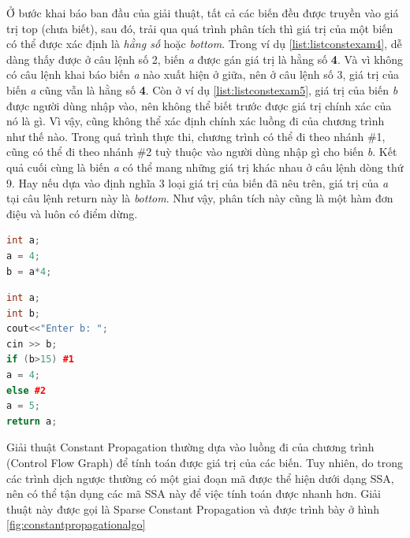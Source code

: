 Ở bước khai báo ban đầu của giải thuật, tất cả các biến đều được truyền vào giá trị top (chưa biết), sau đó, trải qua quá trình phân tích thì giá trị của một biến có thể được xác định là \textit{hằng số} hoặc \textit{bottom}. Trong ví dụ \ref{list:listconstexam4}, dễ dàng thấy được ở câu lệnh số 2, biến \textit{a} được gán giá trị là hằng số \textbf{4}. Và vì không có câu lệnh khai báo biến \textit{a} nào xuất hiện ở giữa, nên ở câu lệnh số 3, giá trị của biến \textit{a} cũng vẫn là hằng số \textbf{4}. Còn ở ví dụ \ref{list:listconstexam5}, giá trị của biến \textit{b} được người dùng nhập vào, nên không thể biết trước được giá trị chính xác của nó là gì. Vì vậy, cũng không thể xác định chính xác luồng đi của chương trình như thế nào. Trong quá trình thực thi, chương trình có thể đi theo nhánh \#1, cũng có thể đi theo nhánh \#2 tuỳ thuộc vào người dùng nhập gì cho biến \textit{b}. Kết quả cuối cùng là biến \textit{a} có thể mang những giá trị khác nhau ở câu lệnh dòng thứ 9. Hay nếu dựa vào định nghĩa 3 loại giá trị của biến đã nêu trên, giá trị của \textit{a} tại câu lệnh return này là \textit{bottom}. Như vậy, phân tích này cũng là một hàm đơn điệu \cite{constantpropagation} và luôn có điểm dừng.
\begin{lstlisting}[caption={Đoạn mã ví dụ biến có giá trị là hằng số},label={list:listconstexam4}, language=c++]
int a;
a = 4;
b = a*4;
\end{lstlisting}
\begin{lstlisting}[caption={Đoạn mã ví dụ biến có giá trị là bottom},label={list:listconstexam5}, language=c++]
int a;
int b;
cout<<"Enter b: ";
cin >> b;
if (b>15) #1
a = 4;
else #2
a = 5;
return a;
\end{lstlisting}

Giải thuật Constant Propagation thường dựa vào luồng đi của chương trình (Control Flow Graph) để tính toán được giá trị của các biến. Tuy nhiên, do trong các trình dịch ngược thường có một giai đoạn mã được thể hiện dưới dạng SSA, nên có thể tận dụng các mã SSA này để việc tính toán được nhanh hơn. Giải thuật này được gọi là Sparse Constant Propagation và được trình bày ở hình \ref{fig:constantpropagationalgo}

